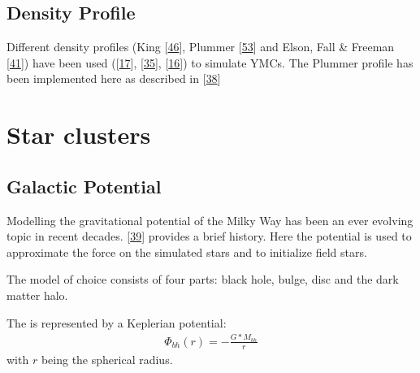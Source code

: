 \documentclass[letterpaper,10pt,english]{sphinxmanual}
\begin{document}
		
		\subsection{Density Profile}
			\label{\detokenize{NBodySimulation/Initialization:density-profile}}
			\sphinxAtStartPar
			Different density profiles (King {[}\hyperlink{cite.NBodySimulation/Appendix:id40}{46}{]}, Plummer {[}\hyperlink{cite.NBodySimulation/Appendix:id41}{53}{]} and Elson, Fall \& Freeman {[}\hyperlink{cite.NBodySimulation/Appendix:id42}{41}{]}) have been used ({[}\hyperlink{cite.NBodySimulation/Appendix:id36}{17}{]}, {[}\hyperlink{cite.NBodySimulation/Appendix:id37}{35}{]}, {[}\hyperlink{cite.NBodySimulation/Appendix:id38}{16}{]}) to simulate YMCs.
			The Plummer profile has been implemented here as described in {[}\hyperlink{cite.NBodySimulation/Appendix:id39}{38}{]} 


	\section{Star clusters}

		\subsection{Galactic Potential}
			\label{\detokenize{NBodySimulation/Potential:galactic-potential}}\label{\detokenize{NBodySimulation/Potential:galactic-potential-label}}\label{\detokenize{NBodySimulation/Potential::doc}}
			\sphinxAtStartPar
			Modelling the gravitational potential of the Milky Way has been an ever evolving topic in recent decades. {[}\hyperlink{cite.NBodySimulation/Appendix:id58}{39}{]} provides a brief history.
			Here the potential is used to approximate the force on the simulated stars and to initialize field stars.
			
			\sphinxAtStartPar
			The model of choice consists of four parts: black hole, bulge, disc and the dark matter halo.
			
			\sphinxAtStartPar
			The  is represented by a Keplerian potential:
			\begin{equation*}
			\begin{split}\Phi_{bh}\left ( r \right ) = -\frac{G*M_{bh}}{r}\end{split}
			\end{equation*}
			\sphinxAtStartPar
			with \(r\) being the spherical radius.
			
\end{document}
